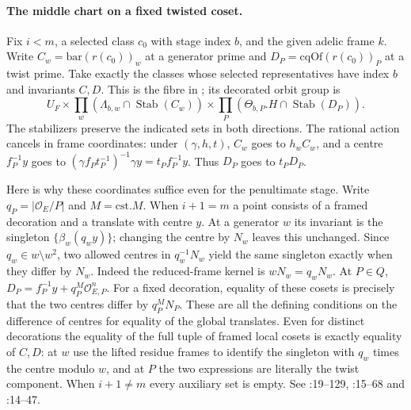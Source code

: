 \paragraph{The middle chart on a fixed twisted coset.}
Fix $i<m$, a selected class $c_0$ with stage index $b$, and the given
adelic frame $k$. Write $C_w=\mathrm{bar}(r(c_0))_w$ at a generator
prime and $D_P=\mathrm{cqOf}(r(c_0))_P$ at a twist prime.
Take exactly the classes whose selected representatives have index $b$
and invariants $C,D$. This is the fibre in ;
its decorated orbit group is
\[
 U_F\times\prod_w(\Lambda_{b,w}\cap\operatorname{Stab}(C_w))
       \times\prod_P(\Theta_{b,P}.H\cap\operatorname{Stab}(D_P)).
\]
The stabilizers preserve the indicated sets in both directions. The
rational action cancels in frame coordinates: under $(\gamma,h,t)$,
$C_w$ goes to $h_w C_w$, and a centre $f_P^{-1}y$ goes to
$(\gamma f_P t_P^{-1})^{-1}\gamma y=t_P f_P^{-1}y$.
Thus $D_P$ goes to $t_P D_P$.

Here is why these coordinates suffice even for the penultimate stage.
Write $q_P=|\mathcal O_E/P|$ and $M=\mathrm{cst}.M$. When
$i+1=m$ a point consists of a framed decoration and a translate
with centre $y$. At a generator $w$ its invariant is the singleton
$\{\beta_w(q_w y)\}$; changing the centre by $N_w$ leaves this
unchanged. Since $q_w\in w\setminus w^2$, two allowed centres
in $q_w^{-1}N_w$ yield the same singleton exactly when they differ
by $N_w$. Indeed the reduced-frame kernel is $wN_w=q_w N_w$.
At $P\in Q$, $D_P=f_P^{-1}y+q_P^M\mathcal O_{E,P}^{n}$.
For a fixed decoration, equality of these cosets is precisely that
the two centres differ by $q_P^M N_P$. These are all the defining
conditions on the difference of centres for equality of the global
translates. Even for distinct decorations the equality of the
full tuple of framed local cosets is exactly equality of $C,D$:
at $w$ use the lifted residue frames to identify the singleton with
$q_w$ times the centre modulo $w$, and at $P$ the two expressions
are literally the twist component. When $i+1\ne m$ every auxiliary
set is empty. See :19--129,
:15--68 and
:14--47.

